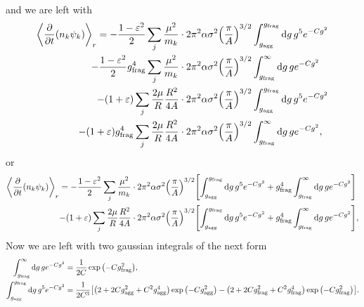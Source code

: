 \documentclass[aps,prl,preprint,groupedaddress,10pt]{revtex4-2}
\begin{document}
and we are left with
\begin{equation}
    \begin{split}
        \avg{\pdv{t}(n_k\psi_k)}_r=-\frac{1-\eps^2}{2}\sum_{j}\frac{\mu^2}{m_k}\cdot
        2\pi^2\alpha\sigma^2\pqty{\frac{\pi}{A}}^{3/2}
        &\int_{\ltx{g}{agg}}^{\ltx{g}{frag}}\dd{g}g^{5}e^{-Cg^2}\\
        -\frac{1-\eps^2}{2}\ltx{g}{frag}^4\sum_{j}\frac{\mu^2}{m_k}\cdot
        2\pi^2\alpha\sigma^2\pqty{\frac{\pi}{A}}^{3/2}
        &\int_{\ltx{g}{frag}}^{\infty}\dd{g}ge^{-Cg^2}\\
        -\pqty{1+\eps}\sum_{j}\frac{2\mu}{R}\frac{R^2}{4A}
        \cdot 2\pi^2\alpha\sigma^2\pqty{\frac{\pi}{A}}^{3/2}
        &\int_{\ltx{g}{agg}}^{\ltx{g}{frag}}
        \dd{g}g^5 e^{-Cg^2}\\
        -\pqty{1+\eps}\ltx{g}{frag}^4\sum_{j}\frac{2\mu}{R}\frac{R^2}{4A}
        \cdot 2\pi^2\alpha\sigma^2\pqty{\frac{\pi}{A}}^{3/2}
        &\int_{\ltx{g}{frag}}^{\infty}
        \dd{g}g e^{-Cg^2},
    \end{split}
\end{equation}
or
\begin{equation}
    \begin{split}
        \avg{\pdv{t}(n_k\psi_k)}_r=-\frac{1-\eps^2}{2}\sum_{j}\frac{\mu^2}{m_k}\cdot
        2\pi^2\alpha\sigma^2\pqty{\frac{\pi}{A}}^{3/2}
        &\bqty{\int_{\ltx{g}{agg}}^{\ltx{g}{frag}}\dd{g}g^{5}e^{-Cg^2}+
        \ltx{g}{frag}^4\int_{\ltx{g}{frag}}^{\infty}\dd{g}ge^{-Cg^2}}\\
        -\pqty{1+\eps}\sum_{j}\frac{2\mu}{R}\frac{R^2}{4A}
        \cdot 2\pi^2\alpha\sigma^2\pqty{\frac{\pi}{A}}^{3/2}
        &\bqty{\int_{\ltx{g}{agg}}^{\ltx{g}{frag}}\dd{g}g^5 e^{-Cg^2}+
            \ltx{g}{frag}^4\int_{\ltx{g}{frag}}^{\infty}\dd{g}g e^{-Cg^2}},
    \end{split}
\end{equation}
Now we are left with two gaussian integrals of the next form
\begin{equation}
    \begin{split}
        \int_{\ltx{g}{frag}}^{\infty}\dd{g}ge^{-Cg^2}&=
        \frac{1}{2C}\exp\pqty{-C\ltx{g}{frag}^2},\\
        \int_{\ltx{g}{agg}}^{\ltx{g}{frag}}\dd{g}g^{5}e^{-Cg^2}&=
        \frac{1}{2C^3}\bqty{\pqty{2+2C\ltx{g}{agg}^2+C^2\ltx{g}{agg}^4}
            \exp\pqty{-C\ltx{g}{agg}^2}-
            \pqty{2+2C\ltx{g}{frag}^2+C^2\ltx{g}{frag}^4}
            \exp\pqty{-C\ltx{g}{frag}^2}}.
    \end{split}
\end{equation}
\end{document}
